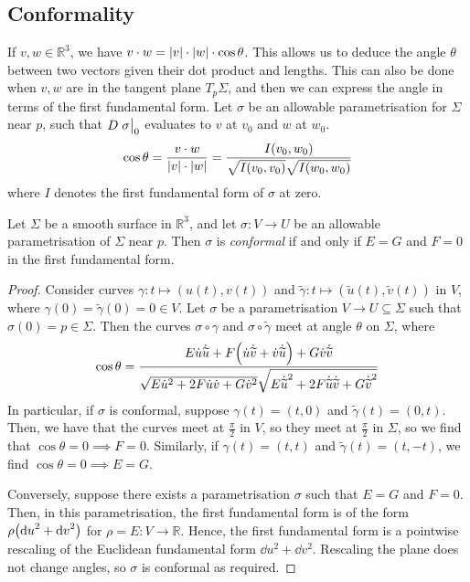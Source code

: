 \documentclass[a4paper]{article}
\begin{document}
\subsection{Conformality}
If \( v,w \in \mathbb R^3 \), we have \( v \cdot w = \abs{v} \cdot \abs{w} \cdot \cos\theta \).
This allows us to deduce the angle \( \theta \) between two vectors given their dot product and lengths.
This can also be done when \( v,w \) are in the tangent plane \( T_p \Sigma \), and then we can express the angle in terms of the first fundamental form.
Let \( \sigma \) be an allowable parametrisation for \( \Sigma \) near \( p \), such that \( D\eval{\sigma}_0 \) evaluates to \( v \) at \( v_0 \) and \( w \) at \( w_0 \).
\[
	\cos \theta = \frac{v \cdot w}{\abs{v} \cdot \abs{w}} = \frac{I(v_0, w_0)}{\sqrt{I(v_0,v_0)} \sqrt{I(w_0,w_0)}}
\]
where \( I \) denotes the first fundamental form of \( \sigma \) at zero.
\begin{lemma}
	Let \( \Sigma \) be a smooth surface in \( \mathbb R^3 \), and let \( \sigma \colon V \to U \) be an allowable parametrisation of \( \Sigma \) near \( p \).
	Then \( \sigma \) is \textit{conformal} if and only if \( E = G \) and \( F = 0 \) in the first fundamental form.
\end{lemma}
\begin{proof}
	Consider curves \( \gamma \colon t \mapsto (u(t), v(t)) \) and \( \widetilde \gamma \colon t \mapsto (\widetilde u(t), \widetilde v(t)) \) in \( V \), where \( \gamma(0) = \widetilde \gamma(0) = 0 \in V \).
	Let \( \sigma \) be a parametrisation \( V \to U \subseteq \Sigma \) such that \( \sigma(0) = p \in \Sigma \).
	Then the curves \( \sigma \circ \gamma \) and \( \sigma \circ \widetilde \gamma \) meet at angle \( \theta \) on \( \Sigma \), where
	\[
		\cos \theta = \frac{E \dot u \dot {\widetilde u} + F \qty(\dot u \dot{\widetilde v} + \dot v \dot{\widetilde u}) + G \dot v \dot{\widetilde v}}{\sqrt{E \dot u^2 + 2F \dot u \dot v + G \dot v^2} \sqrt{E \dot{\widetilde u}^2 + 2F \dot{\widetilde u} \dot {\widetilde v} + G \dot{\widetilde v}^2}}
	\]
	In particular, if \( \sigma \) is conformal, suppose \( \gamma(t) = (t,0) \) and \( \widetilde \gamma(t) = (0,t) \).
	Then, we have that the curves meet at \( \frac{\pi}{2} \) in \( V \), so they meet at \( \frac{\pi}{2} \) in \( \Sigma \), so we find that \( \cos \theta = 0 \implies F = 0 \).
	Similarly, if \( \gamma(t) = (t,t) \) and \( \widetilde \gamma(t) = (t,-t) \), we find \( \cos \theta = 0 \implies E = G \).

	Conversely, suppose there exists a parametrisation \( \sigma \) such that \( E = G \) and \( F = 0 \).
	Then, in this parametrisation, the first fundamental form is of the form \( \rho \qty(\dd{u}^2 + \dd{v}^2) \) for \( \rho = E \colon V \to \mathbb R \).
	Hence, the first fundamental form is a pointwise rescaling of the Euclidean fundamental form \( \dd{u}^2 + \dd{v}^2 \).
	Rescaling the plane does not change angles, so \( \sigma \) is conformal as required.
\end{proof}
\end{document}
